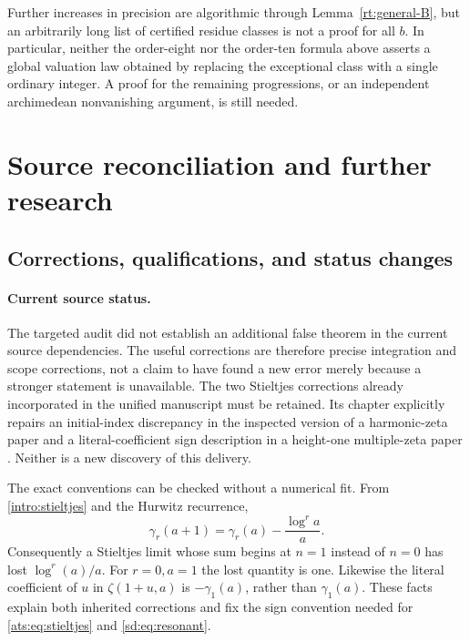 \documentclass[11pt,a4paper]{article}
\numberwithin{equation}{section}
\theoremstyle{definition}
\theoremstyle{remark}
\begin{document}
Further increases in precision are algorithmic through
Lemma~\ref{rt:general-B}, but an arbitrarily long list of certified
residue classes is not a proof for all $b$. In particular, neither
the order-eight nor the order-ten formula above asserts a global
valuation law obtained by replacing the exceptional class with a
single ordinary integer. A proof for the remaining progressions,
or an independent archimedean nonvanishing argument, is still needed.


\section{Source reconciliation and further research}
\label{audit:section}

\subsection{Corrections, qualifications, and status changes}

\paragraph{Current source status.}
The targeted audit did not establish an additional false theorem in the
current source dependencies. The useful corrections are therefore
precise integration and scope corrections, not a claim to have found
a new error merely because a stronger statement is unavailable.
The two Stieltjes corrections already incorporated in the unified
manuscript must be retained. Its chapter
 explicitly repairs an
initial-index discrepancy in the inspected version of a harmonic-zeta
paper and a literal-coefficient sign description in a height-one
multiple-zeta paper \cite{ProveIt}. Neither is a new discovery of this
delivery.

The exact conventions can be checked without a numerical fit. From
\eqref{intro:stieltjes} and the Hurwitz recurrence,
\[
 \gamma_r(a+1)=\gamma_r(a)-\frac{\log^r a}{a}.
\]
Consequently a Stieltjes limit whose sum begins at $n=1$ instead of
$n=0$ has lost $\log^r(a)/a$. For $r=0,a=1$ the lost quantity is
one. Likewise the literal coefficient of $u$ in
$\zeta(1+u,a)$ is $-\gamma_1(a)$, rather than $\gamma_1(a)$.
These facts explain both inherited corrections and fix the sign
convention needed for \eqref{ats:eq:stieltjes} and
\eqref{sd:eq:resonant}.
\end{document}
